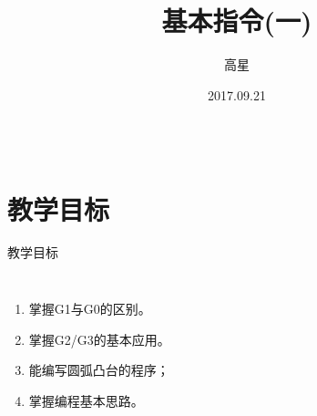 \documentclass[UTF8,zihao=-4]{ctexbeamer}
\title{基本指令(一)}
\author{高星}
\institute{湖南潇湘技师学院~湖南九嶷职院}
\date{2017.09.21}
\begin{document}
    
\begin{frame}[plain]
		\maketitle
\end{frame}

\begin{frame}
\begin{columns}
\tableofcontents[hideallsubsections]
\end{columns}
\end{frame}

\section*{教学目标}

\begin{frame}{教学目标}
    \begin{columns}
        \begin{enumerate}
            \item 掌握G1与G0的区别。
            \item 掌握G2/G3的基本应用。
            \item 能编写圆弧凸台的程序；
            \item 掌握编程基本思路。
        \end{enumerate}
    \end{columns}
\end{frame}
\end{document}
